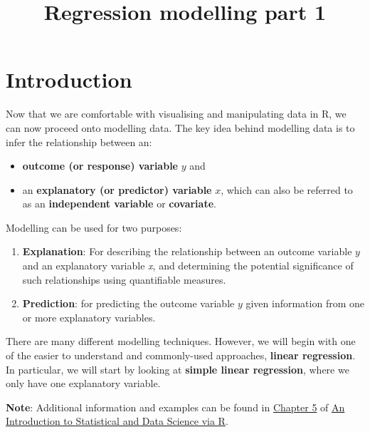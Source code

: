 \documentclass[
  letterpaper,
  DIV=11,
  numbers=noendperiod]{scrartcl}
\title{Regression modelling part 1}
\author{}
\date{}
\makeatletter
\providecommand{\tightlist}{%
  \setlength{\itemsep}{0pt}\setlength{\parskip}{0pt}}\usepackage{longtable,booktabs,array}
\renewcommand{\maketitle}{\bgroup\setlength{\parindent}{0pt}
\begin{flushleft}
  {\color{uniblue}\sffamily\huge\textbf{\@title}} \vspace{0.3cm} \newline
  {\Large {\@subtitle}} \newline
  \@author
\end{flushleft}\egroup
}
\renewcommand*\contentsname{Table of contents}
\newcommand\contentsname{Table of contents}
\makeatother
\begin{document}
\maketitle

\pagestyle{mystyle}

\renewcommand*\contentsname{Contents}
{
\hypersetup{linkcolor=}
\setcounter{tocdepth}{3}
\tableofcontents
}
\section{Introduction}\label{introduction}

Now that we are comfortable with visualising and manipulating data in R,
we can now proceed onto modelling data. The key idea behind modelling
data is to infer the relationship between an:

\begin{itemize}
\tightlist
\item
  \textbf{outcome (or response) variable} \(y\) and
\item
  an \textbf{explanatory (or predictor) variable} \(x\), which can also
  be referred to as an \textbf{independent variable} or
  \textbf{covariate}.
\end{itemize}

Modelling can be used for two purposes:

\begin{enumerate}
\def\labelenumi{\arabic{enumi}.}
\item
  \textbf{Explanation}: For describing the relationship between an
  outcome variable \(y\) and an explanatory variable \emph{x}, and
  determining the potential significance of such relationships using
  quantifiable measures.
\item
  \textbf{Prediction}: for predicting the outcome variable \(y\) given
  information from one or more explanatory variables.
\end{enumerate}

There are many different modelling techniques. However, we will begin
with one of the easier to understand and commonly-used approaches,
\textbf{linear regression}. In particular, we will start by looking at
\textbf{simple linear regression}, where we only have one explanatory
variable.

\textbf{Note}: Additional information and examples can be found in
\href{https://moderndive.com/5-regression.html}{Chapter 5} of
\href{https://moderndive.com/index.html}{An Introduction to Statistical
and Data Science via R}.
\end{document}
